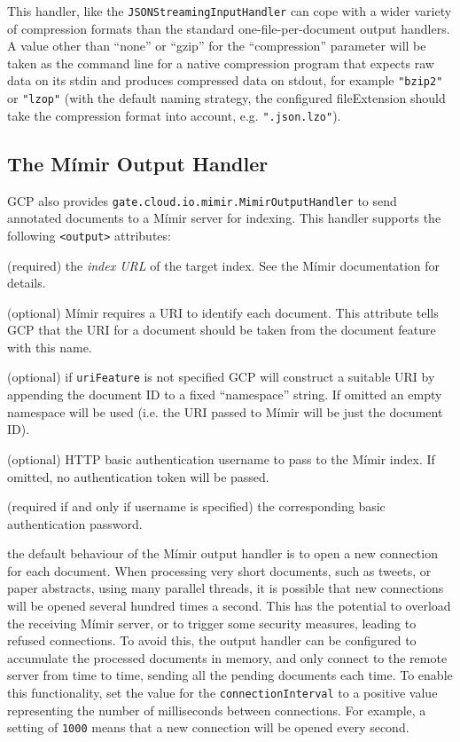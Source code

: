 This handler, like the \verb!JSONStreamingInputHandler! can cope with a wider
variety of compression formats than the standard one-file-per-document output
handlers.  A value other than ``none'' or ``gzip'' for the ``compression''
parameter will be taken as the command line for a native compression program
that expects raw data on its stdin and produces compressed data on stdout, for
example \verb!"bzip2"! or \verb!"lzop"! (with the default naming strategy, the
configured fileExtension should take the compression format into account, e.g.
\verb!".json.lzo"!).

\subsection{The M\'{i}mir Output Handler}

GCP also provides \verb!gate.cloud.io.mimir.MimirOutputHandler! to send annotated documents to a M\'{i}mir server for indexing.  This handler supports the following \verb!<output>! attributes:

\bde
\item[indexUrl] (required) the {\em index URL} of the target index.  See the
  M\'{i}mir documentation for details.
\item[uriFeature] (optional) M\'{i}mir requires a URI to identify each
  document.  This attribute tells GCP that the URI for a document should be
  taken from the document feature with this name.
\item[namespace] (optional) if \verb!uriFeature! is not specified GCP will
  construct a suitable URI by appending the document ID to a fixed
  ``namespace'' string.  If omitted an empty namespace will be used (i.e. the
  URI passed to M\'{i}mir will be just the document ID).
\item[username] (optional) HTTP basic authentication username to pass to the
  M\'{i}mir index.  If omitted, no authentication token will be passed.
\item[password] (required if and only if username is specified) the
  corresponding basic authentication password.
\item[connectionInterval] the default behaviour of the M\'{i}mir output handler
  is to open a new connection for each document. When processing very short
  documents, such as tweets, or paper abstracts, using many parallel threads, 
  it is possible that new connections will be opened several hundred times a
  second. This has the potential to overload the receiving M\'{i}mir server, or
  to trigger some security measures, leading to refused connections. To avoid 
  this, the output handler can be configured to accumulate the processed 
  documents in memory, and only connect to the remote server from time to time, 
  sending all the pending documents each time. To enable this functionality, set 
  the value for the {\tt connectionInterval} to a positive value representing 
  the number of milliseconds between connections. For example, a setting of 
  {\tt 1000} means that a new connection will be opened every second.
\ede

